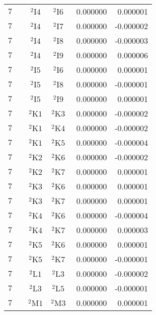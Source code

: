 \begin{longtable}{|c|c|c|c|c|c|}
    $7$ &  & ${}^{2}{\text{I4}}$ & ${}^{2}{\text{I6}}$ & \,\,0.000000 & \,\,0.000001 \\
    $7$ &  & ${}^{2}{\text{I4}}$ & ${}^{2}{\text{I7}}$ & \,\,0.000000 & -0.000002 \\
    $7$ &  & ${}^{2}{\text{I4}}$ & ${}^{2}{\text{I8}}$ & \,\,0.000000 & -0.000003 \\
    $7$ &  & ${}^{2}{\text{I4}}$ & ${}^{2}{\text{I9}}$ & \,\,0.000000 & \,\,0.000006 \\
    $7$ &  & ${}^{2}{\text{I5}}$ & ${}^{2}{\text{I6}}$ & \,\,0.000000 & \,\,0.000001 \\
    $7$ &  & ${}^{2}{\text{I5}}$ & ${}^{2}{\text{I8}}$ & \,\,0.000000 & -0.000001 \\
    $7$ &  & ${}^{2}{\text{I5}}$ & ${}^{2}{\text{I9}}$ & \,\,0.000000 & \,\,0.000001 \\
    $7$ &  & ${}^{2}{\text{K1}}$ & ${}^{2}{\text{K3}}$ & \,\,0.000000 & -0.000002 \\
    $7$ &  & ${}^{2}{\text{K1}}$ & ${}^{2}{\text{K4}}$ & \,\,0.000000 & -0.000002 \\
    $7$ &  & ${}^{2}{\text{K1}}$ & ${}^{2}{\text{K5}}$ & \,\,0.000000 & -0.000004 \\
    $7$ &  & ${}^{2}{\text{K2}}$ & ${}^{2}{\text{K6}}$ & \,\,0.000000 & -0.000002 \\
    $7$ &  & ${}^{2}{\text{K2}}$ & ${}^{2}{\text{K7}}$ & \,\,0.000000 & \,\,0.000001 \\
    $7$ &  & ${}^{2}{\text{K3}}$ & ${}^{2}{\text{K6}}$ & \,\,0.000000 & \,\,0.000001 \\
    $7$ &  & ${}^{2}{\text{K3}}$ & ${}^{2}{\text{K7}}$ & \,\,0.000000 & \,\,0.000001 \\
    $7$ &  & ${}^{2}{\text{K4}}$ & ${}^{2}{\text{K6}}$ & \,\,0.000000 & -0.000004 \\
    $7$ &  & ${}^{2}{\text{K4}}$ & ${}^{2}{\text{K7}}$ & \,\,0.000000 & \,\,0.000003 \\
    $7$ &  & ${}^{2}{\text{K5}}$ & ${}^{2}{\text{K6}}$ & \,\,0.000000 & \,\,0.000001 \\
    $7$ &  & ${}^{2}{\text{K5}}$ & ${}^{2}{\text{K7}}$ & \,\,0.000000 & -0.000001 \\
    $7$ &  & ${}^{2}{\text{L1}}$ & ${}^{2}{\text{L3}}$ & \,\,0.000000 & -0.000002 \\
    $7$ &  & ${}^{2}{\text{L3}}$ & ${}^{2}{\text{L5}}$ & \,\,0.000000 & -0.000001 \\
    $7$ &  & ${}^{2}{\text{M1}}$ & ${}^{2}{\text{M3}}$ & \,\,0.000000 & \,\,0.000001 \\

\end{longtable}
